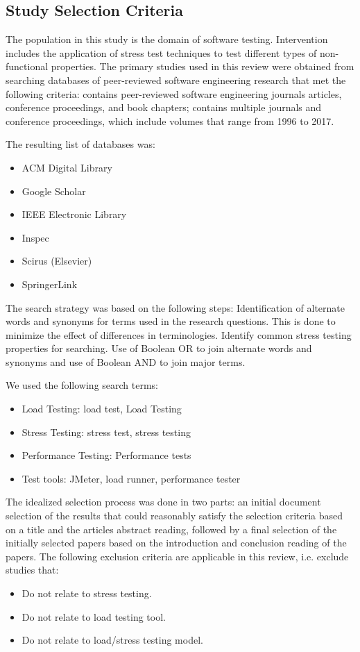 \documentclass[espaco=umemeio,chapter=TITLE,twoside,openright]{abnt}
\begin{document}
\subsection{Study Selection Criteria}

The population in this study is the domain of software testing. Intervention includes the application of stress test techniques to test different types of non-functional properties. The primary studies used in this review were obtained from
searching databases of peer-reviewed software engineering research that met the following criteria: contains peer-reviewed software engineering journals articles, conference proceedings, and book chapters; contains multiple journals and conference proceedings,
which include volumes that range from 1996 to 2017.

The resulting list of databases was:

\begin{itemize}
\item  ACM Digital Library
\item  Google Scholar
\item  IEEE Electronic Library
\item  Inspec
\item  Scirus (Elsevier)
\item SpringerLink
\end{itemize}


The search strategy was based on the following steps:  Identification of alternate words and synonyms for terms used
in the research questions. This is done to minimize the effect
of differences in terminologies. Identify common stress testing properties for searching.  Use of Boolean OR to join alternate words and synonyms and use of Boolean AND to join major terms.

We used the following search terms:

\begin{itemize}
\item Load Testing: load test, Load Testing
\item Stress Testing: stress test, stress testing
\item Performance Testing: Performance tests
\item Test tools: JMeter, load runner, performance tester
\end{itemize}



The idealized selection process was done in two parts: an initial document selection of the results that could reasonably satisfy the selection criteria based on a title and the articles abstract reading, followed by a final selection of the initially selected papers based on the introduction and conclusion reading of the papers. The following exclusion criteria are applicable in this review, i.e. exclude studies that:
\begin{itemize}
\item Do not relate to stress testing.
\item Do not relate to load testing tool.
\item Do not relate to load/stress testing model.
\end{itemize}
\end{document}
